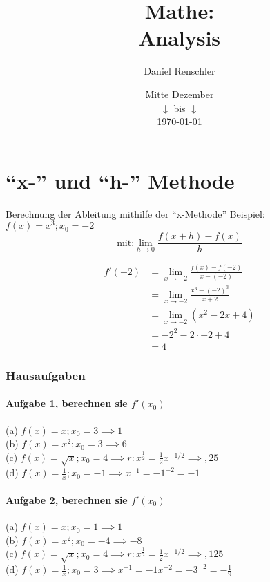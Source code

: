 \documentclass{book}
\title{\Huge{Mathe:}\\Analysis}
\author{\huge{Daniel Renschler}}
\date{Mitte Dezember\\ $\downarrow$ bis $\downarrow$ \\ \today}
\begin{document}
\maketitle

\tableofcontents
\clearpage



\chapter{``x-'' und ``h-'' Methode}
Berechnung der Ableitung mithilfe der ``x-Methode''
Beispiel: $f(x)=x^{3}; x_{0}=-2$ 
\begin{equation}
\text{mit:} \lim_{h \rightarrow 0} \frac{f(x+h)-f(x)}{h}
\end{equation}

\begin{align*}
     f'(-2) & = \lim_{x\to-2}\frac{f(x)-f(-2)}{x-(-2)} \\
			& = \lim_{x\to-2}\frac{x^{3}-(-2)^3}{x+2} \\
			& = \lim_{x\to-2}(x^{2}-2x+4) \\
			& = -2^{2}-2\cdot -2+4\\
			& = 4
\end{align*}

\subsection{Hausaufgaben}
\subsubsection{Aufgabe 1, berechnen sie $f'(x_0)$}
(a)	$f(x)=x;x_{0}=3 \implies 1$\\
(b)	$f(x)=x^{2};x_{0}=3 \implies 6$\\
(c)	$f(x)=\sqrt{x};x_{0}=4 \implies r: x^{\frac{1}{2}}=\frac{1}{2}x^{-1/2}\implies ,25$\\
(d)	$f(x)=\frac{1}{x};x_{0}=-1 \implies x^{-1}=-1^{-2}=-1$

\subsubsection{Aufgabe 2, berechnen sie $f'(x_0)$}
(a)	$f(x)=x;x_{0}=1 \implies 1$\\
(b)	$f(x)=x^{2};x_{0}=-4 \implies -8$\\
(c)	$f(x)=\sqrt{x};x_{0}=4 \implies r: x^{\frac{1}{2}}=\frac{1}{2}x^{-1/2}\implies ,125$\\
(d)	$f(x)=\frac{1}{x};x_{0}=3 \implies x^{-1}=-1x^{-2}=-3^{-2}=-\frac{1}{9}$
\end{document}
